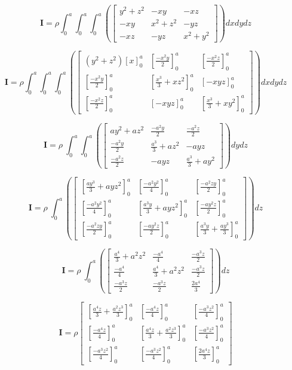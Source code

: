 \[\bm{I} = \rho\int_0^a \int_0^a \int_0^a  \left(\begin{bmatrix}y^2 + z^2 & -xy & -xz \\ -xy & x^2 + z^2 & -yz \\ -xz & -yz & x^2 + y^2 \end{bmatrix}\right)dxdydz\]

\[\bm{I} = \rho \int_0^a \int_0^a \int_0^a  \left(\begin{bmatrix}(y^2 + z^2)\left[x\right]_0^a & \left[\frac{-x^2y}{2}\right]_0^a & \left[\frac{-x^2z}{2}\right]_0^a \\ \left[\frac{-x^2y}{2}\right]_0^a & \left[\frac{x^3}{3} + xz^2\right]_0^a & \left[-xyz\right]_0^a \\ \left[\frac{-x^2z}{2}\right]_0^a & \left[-xyz\right]_0^a & \left[\frac{x^3}{3} + xy^2\right]_0^a \end{bmatrix}\right)dxdydz\]

\[\bm{I} = \rho \ \int_0^a \int_0^a  \left(\begin{bmatrix}ay^2 + az^2 & \frac{-a^2y}{2} & \frac{-a^2z}{2} \\ \frac{-a^2y}{2} & \frac{a^3}{3} + az^2 & -ayz \\ \frac{-a^2z}{2} & -ayz & \frac{a^3}{3} + ay^2 \end{bmatrix}\right)dydz\]

\[\bm{I} = \rho \ \int_0^a  \left(\begin{bmatrix}\left[\frac{ay^3}{3} + ayz^2\right]_0^a & \left[\frac{-a^2y^2}{4}\right]_0^a & \left[\frac{-a^2zy}{2}\right]_0^a \\ \left[\frac{-a^2y^2}{4}\right]_0^a & \left[\frac{a^3y}{3} + ayz^2\right]_0^a & \left[\frac{-ay^2z}{2}\right]_0^a \\ \left[\frac{-a^2zy}{2}\right]_0^a & \left[\frac{-ay^2z}{2}\right]_0^a & \left[\frac{a^3y}{3} + \frac{ay^3}{3}\right]_0^a \end{bmatrix}\right)dz\]

\[\bm{I} = \rho \ \int_0^a \left(\begin{bmatrix}\frac{a^4}{3} + a^2z^2 & \frac{-a^4}{4} & \frac{-a^3z}{2} \\ \frac{-a^4}{4} & \frac{a^4}{3} + a^2z^2 & \frac{-a^3z}{2} \\ \frac{-a^3z}{2} & \frac{-a^3z}{2} & \frac{2a^4}{3}\end{bmatrix}\right)dz\]


\[\bm{I} = \rho \begin{bmatrix} \left[\frac{a^4z}{3} + \frac{a^2z^3}{3}\right]_0^a & \left[\frac{-a^4z}{4}\right]_0^a & \left[\frac{-a^3z^2}{4}\right]_0^a \\ \left[\frac{-a^4z}{4}\right]_0^a & \left[\frac{a^4z}{3} + \frac{a^2z^3}{3}\right]_0^a & \left[\frac{-a^3z^2}{4}\right]_0^a \\ \left[\frac{-a^3z^2}{4}\right]_0^a & \left[\frac{-a^3z^2}{4}\right]_0^a & \left[\frac{2a^4z}{3}\right]_0^a \end{bmatrix}\]

